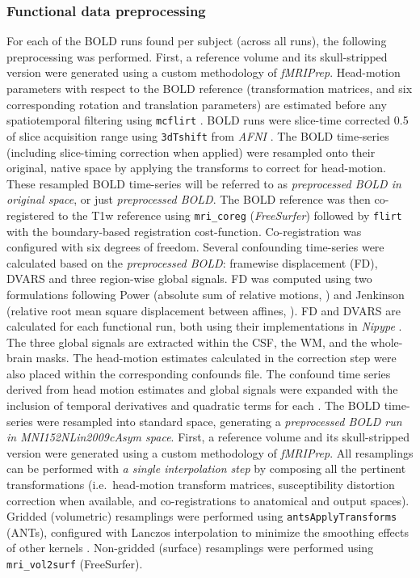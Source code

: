 \documentclass[fleqn,10pt]{wlscirep}
\begin{document}
\subsubsection*{Functional data preprocessing}
For each of the BOLD runs found per subject (across all runs), the following preprocessing was performed. First, a reference
volume and its skull-stripped version were generated using a custom
methodology of \emph{fMRIPrep}. Head-motion parameters with respect to
the BOLD reference (transformation matrices, and six corresponding
rotation and translation parameters) are estimated before any
spatiotemporal filtering using \texttt{mcflirt} \citep[\emph{FSL}
,][]{mcflirt}. BOLD runs were slice-time corrected 0.5 of
slice acquisition range using \texttt{3dTshift} from \emph{AFNI}
\citep[RRID:SCR\_005927]{afni}. The BOLD time-series (including
slice-timing correction when applied) were resampled onto their
original, native space by applying the transforms to correct for
head-motion. These resampled BOLD time-series will be referred to as
\emph{preprocessed BOLD in original space}, or just \emph{preprocessed
BOLD}. The BOLD reference was then co-registered to the T1w reference
using \texttt{mri\_coreg} (\emph{FreeSurfer}) followed by \texttt{flirt}
\citep[\emph{FSL} ,][]{flirt} with the boundary-based registration \citep{bbr}
cost-function. Co-registration was configured with six degrees of
freedom. Several confounding time-series were calculated based on the
\emph{preprocessed BOLD}: framewise displacement (FD), DVARS and three
region-wise global signals. FD was computed using two formulations
following Power (absolute sum of relative motions,
\citet{power_fd_dvars}) and Jenkinson (relative root mean square
displacement between affines, \citet{mcflirt}). FD and DVARS are
calculated for each functional run, both using their implementations in
\emph{Nipype} \citep[following the definitions by][]{power_fd_dvars}.
The three global signals are extracted within the CSF, the WM, and the
whole-brain masks. The head-motion estimates calculated in the correction step were also placed
within the corresponding confounds file. The confound time series
derived from head motion estimates and global signals were expanded with
the inclusion of temporal derivatives and quadratic terms for each
\citep{satterthwaite_2013}. The BOLD time-series were resampled into
standard space, generating a \emph{preprocessed BOLD run in
MNI152NLin2009cAsym space}. First, a reference volume and its
skull-stripped version were generated using a custom methodology of
\emph{fMRIPrep}. All resamplings can be performed with \emph{a single
interpolation step} by composing all the pertinent transformations
(i.e.~head-motion transform matrices, susceptibility distortion
correction when available, and co-registrations to anatomical and output
spaces). Gridded (volumetric) resamplings were performed using
\texttt{antsApplyTransforms} (ANTs), configured with Lanczos
interpolation to minimize the smoothing effects of other kernels
\citep{lanczos}. Non-gridded (surface) resamplings were performed using
\texttt{mri\_vol2surf} (FreeSurfer).
\end{document}
